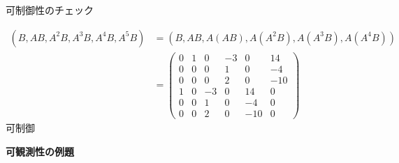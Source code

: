 \documentclass[a4paper,11pt]{jreport}
\begin{document}
可制御性のチェック

\begin{align}
 (B,AB, A^2B, A^3B, A^4B, A^5B)
 &=
 (B,AB, A(AB), A(A^2B), A(A^3B), A(A^4B))
\nonumber \\
 &=
 \left(\begin{array}{rrrrrr}
        0 & 1 & 0 & -3& 0 & 14      \\
        0 & 0 & 0 & 1 & 0 & -4      \\
        0 & 0 & 0 & 2 & 0 &-10      \\
	1 & 0 & -3& 0 & 14& 0 \\
	0 & 0 & 1 & 0 & -4& 0 \\
	0 & 0 & 2 & 0 &-10& 0 
       \end{array}\right)
\nonumber
\end{align}
可制御

\newpage

\noindent
{\bf 可観測性の例題}
\end{document}
